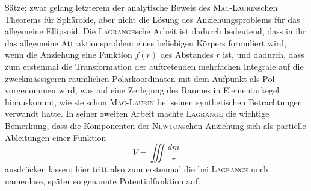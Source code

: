 Sätze; zwar gelang letzterem der analytische Beweis des \textsc{Mac-Laurin}schen
Theorems für Sphäroide, aber nicht die Lösung des Anziehungsproblems
für das allgemeine Ellipsoid. Die \textsc{Lagrange}sche Arbeit ist dadurch
bedeutend, dass in ihr das allgemeine Attraktionsproblem eines beliebigen
Körpers formuliert wird, wenn die Anziehung eine Funktion \(f(r)\) des Abstandes
\(r\) ist, und dadurch, dass zum erstenmal die Transformation der auftretenden
mehrfachen Integrale auf die zweckmässigeren räumlichen Polarkoordinaten
mit dem Aufpunkt als Pol vorgenommen wird, was auf eine Zerlegung des
Raumes in Elementarkegel hinauskommt, wie sie schon \textsc{Mac-Laurin} bei seinen
synthetischen Betrachtungen verwandt hatte. In seiner zweiten Arbeit machte
\textsc{Lagrange} die wichtige Bemerkung, dass die Komponenten der \textsc{Newton}schen
Anziehung sich als partielle Ableitungen einer Funktion
\[
V=\iiint\frac{dm}{r}
\]
\noindent ausdrücken lassen; hier tritt also zum erstenmal die bei \textsc{Lagrange} noch
namenlose, später so genannte Potentialfunktion auf.

